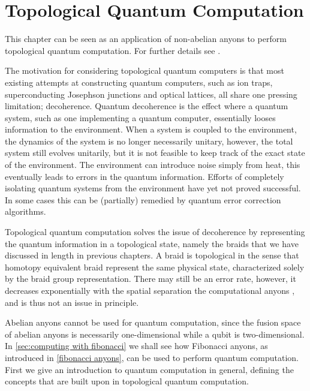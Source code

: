 
\chapter{Topological Quantum Computation}\label{chap:tqc}

This chapter can be seen as an application of non-abelian anyons to perform topological quantum computation. For further details see \cite{nayak,freedman kitaev larsen wang,shor fault-tolerant,braid topologies,ainsworth slingerland}.

The motivation for considering topological quantum computers is that most existing attempts at constructing quantum computers, such as ion traps, superconducting Josephson junctions and optical lattices, all share one pressing limitation; decoherence. Quantum decoherence is the effect where a quantum system, such as one implementing a quantum computer, essentially looses information to the environment. When a system is coupled to the environment, the dynamics of the system is no longer necessarily unitary, however, the total system still evolves unitarily, but it is not feasible to keep track of the exact state of the environment. The environment can introduce noise simply from heat, this eventually leads to errors in the quantum information. Efforts of completely isolating quantum systems from the environment have yet not proved successful. In some cases this can be (partially) remedied by quantum error correction algorithms.

Topological quantum computation solves the issue of decoherence by representing the quantum information in a topological state, namely the braids that we have discussed in length in previous chapters. A braid is topological in the sense that homotopy equivalent braid represent the same physical state, characterized solely by the braid group representation. There may still be an error rate, however, it decreases exponentially with the spatial separation the computational anyons \cite{freedman kitaev larsen wang}, and is thus not an issue in principle.

Abelian anyons cannot be used for quantum computation, since the fusion space of abelian anyons is necessarily one-dimensional while a qubit is two-dimensional. In \cref{sec:computing with fibonacci} we shall see how Fibonacci anyons, as introduced in \cref{fibonacci anyons}, can be used to perform quantum computation. First we give an introduction to quantum computation in general, defining the concepts that are built upon in topological quantum computation.


